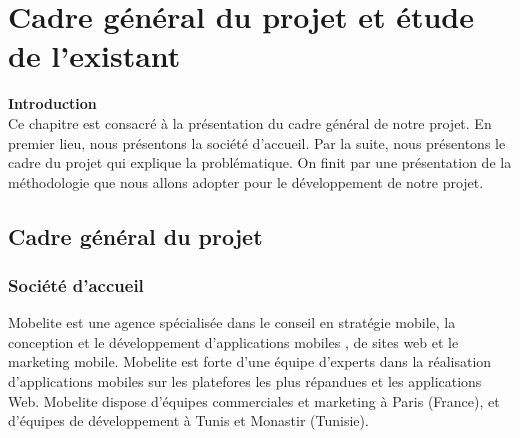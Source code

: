 

\chapter{\Large Cadre général du projet et étude de l'existant}


\textbf{\huge Introduction} \\[0.3cm]





  Ce chapitre est consacré à la présentation du cadre général de notre projet. En premier lieu, nous présentons la société d’accueil. Par la suite, nous présentons le cadre du projet qui explique la problématique. On finit par une présentation de la méthodologie que nous allons adopter pour le développement de notre projet.



\section{\selectfont\Large Cadre général du projet}
\subsection{\selectfont\Large Société d’accueil }
 Mobelite est une agence spécialisée dans le conseil en stratégie mobile, la conception et le développement d’applications mobiles , de sites web et le marketing mobile. Mobelite est forte d’une équipe d’experts dans la réalisation d’applications mobiles sur les platefores les plus répandues et les applications Web. Mobelite dispose d’équipes commerciales et marketing à Paris (France), et d’équipes de développement à Tunis et Monastir (Tunisie).
    
